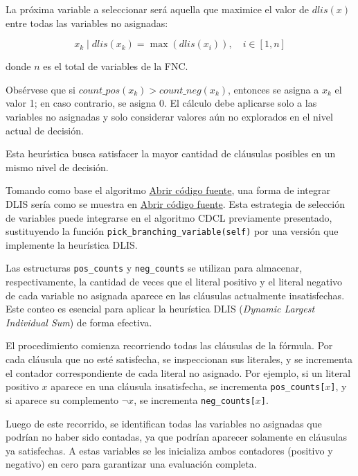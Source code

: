 La pr\'oxima variable a seleccionar ser\'a aquella que maximice el valor de $\textit{dlis}(x)$ entre todas las variables no asignadas:

\begin{equation*}
  x_k \mid \textit{dlis}(x_k) = \max(\textit{dlis}(x_i)),\quad i \in [1,n]
\end{equation*}

donde $n$ es el total de variables de la FNC.

Obs\'ervese que si $\textit{count\_pos}(x_k) > \textit{count\_neg}(x_k)$, entonces se asigna a $x_k$ el valor 1; en caso contrario, se asigna 0. El c\'alculo debe aplicarse solo a las variables no asignadas y solo considerar valores a\'{u}n no explorados en el nivel actual de decisi\'on.

Esta heur\'istica busca satisfacer la mayor cantidad de cl\'ausulas posibles en un mismo nivel de decisi\'on.

Tomando como base el algoritmo \href{Graphics/dpll\_cdcl\_sat\_solver.py}{Abrir c\'odigo fuente}, una forma de integrar DLIS ser\'ia como se muestra en \href{Graphics/dpll\_cdcl\_dlis\_sat\_solver.py}{Abrir c\'odigo fuente}. Esta estrategia de selecci\'on de variables puede integrarse en el algoritmo CDCL previamente presentado, sustituyendo la funci\'on \texttt{pick\_branching\_variable(self)} por una versi\'on que implemente la heur\'istica DLIS.

Las estructuras \texttt{pos\_counts} y \texttt{neg\_counts} se utilizan para almacenar, respectivamente, la cantidad de veces que el literal positivo y el literal negativo de cada variable no asignada aparece en las cláusulas actualmente insatisfechas. Este conteo es esencial para aplicar la heurística DLIS (\textit{Dynamic Largest Individual Sum}) de forma efectiva.

El procedimiento comienza recorriendo todas las cláusulas de la fórmula. Por cada cláusula que no esté satisfecha, se inspeccionan sus literales, y se incrementa el contador correspondiente de cada literal no asignado. Por ejemplo, si un literal positivo $x$ aparece en una cláusula insatisfecha, se incrementa \texttt{pos\_counts[$x$]}, y si aparece su complemento $\neg x$, se incrementa \texttt{neg\_counts[$x$]}.

Luego de este recorrido, se identifican todas las variables no asignadas que podrían no haber sido contadas, ya que podrían aparecer solamente en cláusulas ya satisfechas. A estas variables se les inicializa ambos contadores (positivo y negativo) en cero para garantizar una evaluación completa.

